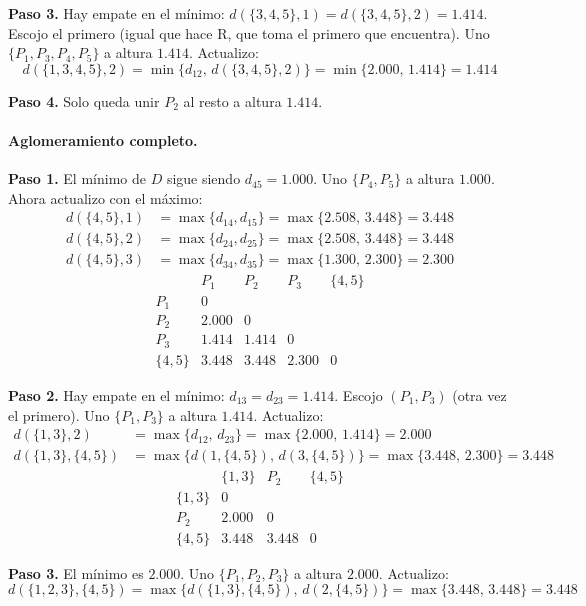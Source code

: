 \documentclass[11pt]{article}\usepackage[]{graphicx}\usepackage[]{xcolor}
\begin{document}
\textbf{Paso 3.} Hay empate en el mínimo: $d(\{3,4,5\},1) = d(\{3,4,5\},2) = 1.414$. Escojo el primero (igual que hace R, que toma el primero que encuentra). Uno $\{P_1,P_3,P_4,P_5\}$ a altura $1.414$. Actualizo:
\[
d(\{1,3,4,5\}, 2) = \min\{d_{12},\, d(\{3,4,5\},2)\} = \min\{2.000,\, 1.414\} = 1.414
\]

\textbf{Paso 4.} Solo queda unir $P_2$ al resto a altura $1.414$.

\paragraph{Aglomeramiento completo.}

\textbf{Paso 1.} El mínimo de $D$ sigue siendo $d_{45} = 1.000$. Uno $\{P_4,P_5\}$ a altura $1.000$. Ahora actualizo con el máximo:
\begin{align*}
d(\{4,5\}, 1) &= \max\{d_{14}, d_{15}\} = \max\{2.508,\, 3.448\} = 3.448\\
d(\{4,5\}, 2) &= \max\{d_{24}, d_{25}\} = \max\{2.508,\, 3.448\} = 3.448\\
d(\{4,5\}, 3) &= \max\{d_{34}, d_{35}\} = \max\{1.300,\, 2.300\} = 2.300
\end{align*}
\[
\begin{array}{c|cccc}
 & P_1 & P_2 & P_3 & \{4,5\}\\ \hline
P_1 & 0 & & & \\
P_2 & 2.000 & 0 & & \\
P_3 & \mathbf{1.414} & \mathbf{1.414} & 0 & \\
\{4,5\} & 3.448 & 3.448 & 2.300 & 0
\end{array}
\]

\textbf{Paso 2.} Hay empate en el mínimo: $d_{13} = d_{23} = 1.414$. Escojo $(P_1,P_3)$ (otra vez el primero). Uno $\{P_1,P_3\}$ a altura $1.414$. Actualizo:
\begin{align*}
d(\{1,3\}, 2) &= \max\{d_{12},\, d_{23}\} = \max\{2.000,\, 1.414\} = 2.000\\
d(\{1,3\}, \{4,5\}) &= \max\{d(1,\{4,5\}),\, d(3,\{4,5\})\} = \max\{3.448,\, 2.300\} = 3.448
\end{align*}
\[
\begin{array}{c|ccc}
 & \{1,3\} & P_2 & \{4,5\}\\ \hline
\{1,3\} & 0 & & \\
P_2 & \mathbf{2.000} & 0 & \\
\{4,5\} & 3.448 & 3.448 & 0
\end{array}
\]

\textbf{Paso 3.} El mínimo es $2.000$. Uno $\{P_1,P_2,P_3\}$ a altura $2.000$. Actualizo:
\[
d(\{1,2,3\}, \{4,5\}) = \max\{d(\{1,3\},\{4,5\}),\, d(2,\{4,5\})\} = \max\{3.448,\, 3.448\} = 3.448
\]
\end{document}
